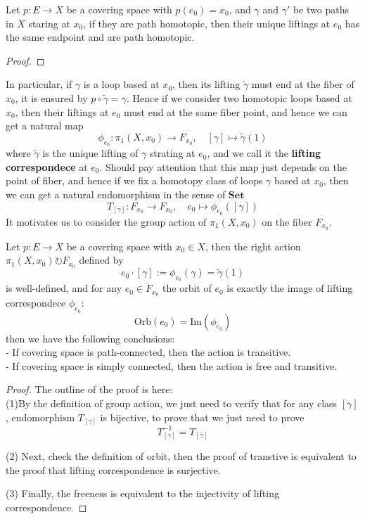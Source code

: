 \begin{corollary}
    Let \(p:E \to X\) be a covering space with \(p(e_0) = x_0\), and \(\gamma\) and \(\gamma'\) be two paths in \(X\) staring at \(x_0\), if they are path homotopic, then their unique liftings at \(e_0\) has the same endpoint and are path homotopic.
\end{corollary}
\begin{proof}
    
\end{proof}

In particular, if \(\gamma\) is a loop based at \(x_0\), then its lifting \(\tilde{\gamma}\) must end at the fiber of \(x_0\), it is ensured by \(p \circ \tilde{\gamma} = \gamma\). Hence if we consider two homotopic loops based at \(x_0\), then their liftings at \(e_0\) must end at the same fiber point, and hence we can get a natural map
\[\phi_{e_0}: \pi_1(X,x_0) \to F_{x_0}, \quad [\gamma] \mapsto \tilde{\gamma}(1)\]
where \(\tilde{\gamma}\) is the unique lifting of \(\gamma\) strating at \(e_0\), and we call it the \textbf{lifting correspondece} at \(e_0\). Should pay attention that this map just depends on the point of fiber, and hence if we fix a homotopy class of loops \(\gamma\) based at \(x_0\), then we can get a natural endomorphism in the sense of \(\mathbf{Set}\)
\[T_{[\gamma]}: F_{x_0} \to F_{x_0}, \quad e_0 \mapsto \phi_{e_0}([\gamma])\]
It motivates us to consider the group action of \(\pi_1(X,x_0)\) on the fiber \(F_{x_0}\).

\begin{theorem} \label{fundamentalgroupaction}
    Let \(p:E \to X\) be a covering space with \(x_0 \in X\), then the right action \(\pi_1(X,x_0) \circlearrowright F_{x_0}\) defined by
    \[e_0 \cdot [\gamma] := \phi_{e_0}(\gamma) = \tilde{\gamma}(1)\]
    is well-defined, and for any \(e_0 \in F_{x_0}\) the orbit of \(e_0\) is exactly the image of lifting correspondece \(\phi_{e_0}\):
    \[\mathrm{Orb}(e_0) = \mathrm{Im}(\phi_{e_0})\]
    then we have the following conclusions:\\

    - If covering space is path-connected, then the action is transitive.\\

    - If covering space is simply connected, then the action is free and transitive.
\end{theorem}
\begin{proof}
    The outline of the proof is here:\\

    (1)By the definition of group action, we just need to verify that for any class \([\gamma]\), endomorphism \(T_{[\gamma]}\) is bijective, to prove that we just need to prove
    \[T_[\gamma]^{-1} = T_[\bar{\gamma}] \]

    (2) Next, check the definition of orbit, then the proof of transtive is equivalent to the proof that lifting correspondence is surjective.

    (3) Finally, the freeness is equivalent to the injectivity of lifting correspondence.
\end{proof}

